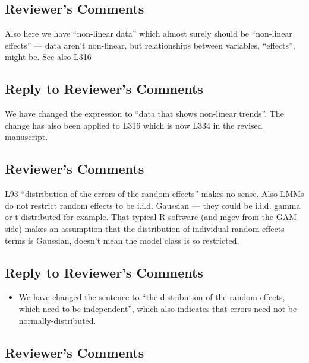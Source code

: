 \documentclass[
]{article}
\providecommand{\tightlist}{%
  \setlength{\itemsep}{0pt}\setlength{\parskip}{0pt}}
\begin{document}
\hypertarget{reviewers-comments-17}{%
\subsection{Reviewer's Comments}\label{reviewers-comments-17}}

Also here we have ``non-linear data'' which almost surely should be ``non-linear effects'' --- data aren't non-linear, but relationships between variables, ``effects'', might be. See also L316

\hypertarget{section-18}{%
\subsection{\texorpdfstring{\textcolor{reviewersblue} {Reply to Reviewer's Comments}}{}}\label{section-18}}

We have changed the expression to ``data that shows non-linear trends''. The change has also been applied to L316 which is now L334 in the revised manuscript.

\hypertarget{reviewers-comments-18}{%
\subsection{Reviewer's Comments}\label{reviewers-comments-18}}

L93 ``distribution of the errors of the random effects'' makes no sense. Also LMMs do not restrict random effects to be i.i.d. Gaussian --- they could be i.i.d. gamma or t distributed for example. That typical R software (and mgcv from the GAM side) makes an assumption that the distribution of individual random effects terms is Gaussian, doesn't mean the model class is so restricted.

\hypertarget{section-19}{%
\subsection{\texorpdfstring{\textcolor{reviewersblue} {Reply to Reviewer's Comments}}{}}\label{section-19}}

\begin{itemize}
\tightlist
\item
  We have changed the sentence to ``the distribution of the random effects, which need to be independent'', which also indicates that errors need not be normally-distributed.
\end{itemize}

\hypertarget{reviewers-comments-19}{%
\subsection{Reviewer's Comments}\label{reviewers-comments-19}}
\end{document}
